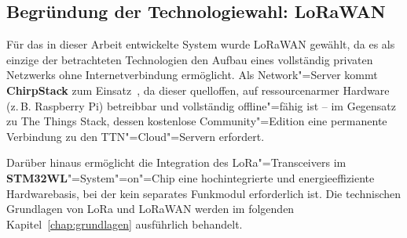 \subsection{Begründung der Technologiewahl: LoRaWAN}
\label{subsec:technologiewahl}

Für das in dieser Arbeit entwickelte System wurde LoRaWAN gewählt, da es als
einzige der betrachteten Technologien den Aufbau eines vollständig privaten
Netzwerks ohne Internetverbindung ermöglicht. Als Network"=Server kommt
\textbf{ChirpStack} zum Einsatz~\cite{chirpstack_docs}, da dieser quelloffen,
auf ressourcenarmer Hardware (z.\,B. Raspberry Pi) betreibbar und vollständig
offline"=fähig ist -- im Gegensatz zu The Things Stack, dessen kostenlose
Community"=Edition eine permanente Verbindung zu den TTN"=Cloud"=Servern erfordert.

Darüber hinaus ermöglicht die Integration des LoRa"=Transceivers im
\textbf{STM32WL}"=System"=on"=Chip eine hochintegrierte und energieeffiziente
Hardwarebasis, bei der kein separates Funkmodul erforderlich ist. Die technischen
Grundlagen von LoRa und LoRaWAN werden im folgenden Kapitel~\ref{chap:grundlagen}
ausführlich behandelt.

